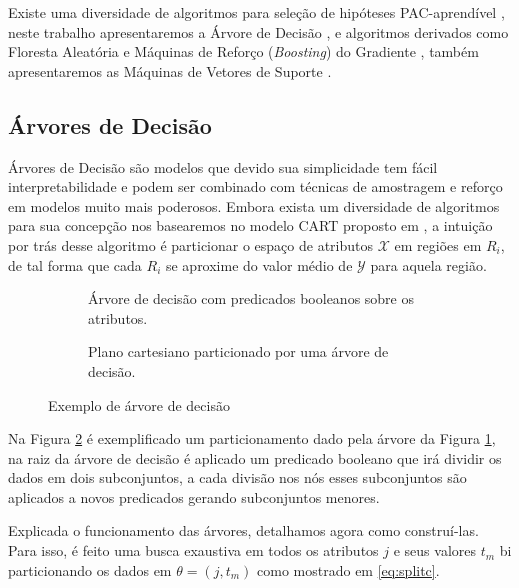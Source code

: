 Existe uma diversidade de algoritmos para seleção de hipóteses PAC-aprendível
\cite{mohri2018foundations}, neste trabalho apresentaremos a
Árvore de Decisão \cite{breiman1984classification}, e algoritmos derivados como Floresta Aleatória \cite{Ho1998,Breiman2001} e Máquinas de
Reforço (\textit{Boosting}) do Gradiente \cite{friedman2001greedy}, também apresentaremos as Máquinas de
Vetores de Suporte \cite{vapnik2013nature}.

\subsection{Árvores de Decisão}
Árvores de Decisão são modelos que devido sua simplicidade tem fácil
interpretabilidade e podem ser combinado com técnicas de amostragem e
reforço em modelos muito mais poderosos. Embora exista um diversidade de
algoritmos para sua concepção nos basearemos no modelo CART proposto em
\cite{breiman1984classification}, a intuição por trás desse algoritmo é
particionar o espaço de atributos $\mathcal{X}$ em regiões em $R_i$, de
tal forma que cada $R_i$ se aproxime do valor médio de $\mathcal{Y}$ para
aquela região.

\begin{figure}[ht]
   \centering
    \begin{subfigure}{.4\textwidth}
        \centering
        \def\svgwidth{1.4\linewidth}
        \caption{Árvore de decisão com predicados booleanos sobre os atributos.}
        \label{fig:tree}
    \end{subfigure}
     \hfill
    \begin{subfigure}{.4\textwidth}
        \centering
        \def\svgwidth{.8\linewidth}
        \caption{Plano cartesiano particionado por uma árvore de decisão.}
        \label{fig:split}
    \end{subfigure}
    \caption{Exemplo de árvore de decisão}
    \label{fig:three graphs}
\end{figure}


Na Figura \ref{fig:split} é exemplificado um particionamento dado pela árvore
da Figura \ref{fig:tree}, na raiz da árvore de decisão é aplicado um predicado
booleano que irá dividir os dados em dois subconjuntos, a cada divisão nos nós
esses subconjuntos são aplicados a novos predicados gerando subconjuntos
menores.

Explicada o funcionamento das árvores, detalhamos agora como construí-las. Para
isso, é feito uma busca exaustiva em todos os atributos $j$ e seus valores
$t_m$ bi particionando os dados em $\theta = (j,t_m)$ como mostrado em
\ref{eq:splitc}.

